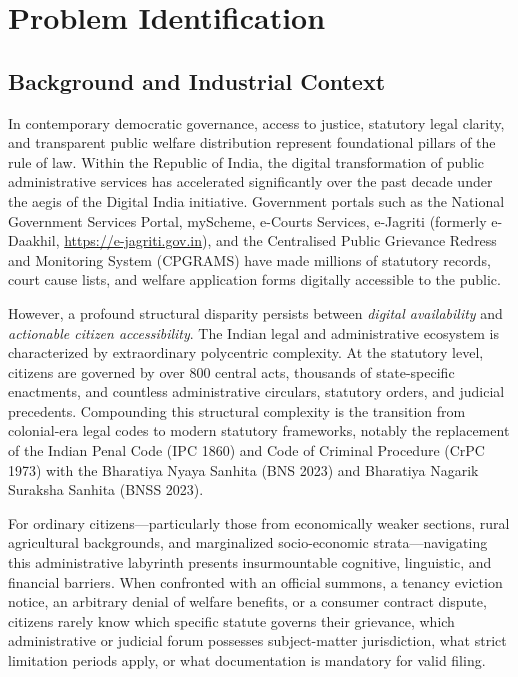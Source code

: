 \chapter{Problem Identification}
\label{ch:problem_identification}

\section{Background and Industrial Context}
\label{sec:background}
In contemporary democratic governance, access to justice, statutory legal clarity, and transparent public welfare distribution represent foundational pillars of the rule of law. Within the Republic of India, the digital transformation of public administrative services has accelerated significantly over the past decade under the aegis of the Digital India initiative. Government portals such as the National Government Services Portal, myScheme, e-Courts Services, e-Jagriti (formerly e-Daakhil, \url{https://e-jagriti.gov.in}), and the Centralised Public Grievance Redress and Monitoring System (CPGRAMS) have made millions of statutory records, court cause lists, and welfare application forms digitally accessible to the public.

However, a profound structural disparity persists between \textit{digital availability} and \textit{actionable citizen accessibility}. The Indian legal and administrative ecosystem is characterized by extraordinary polycentric complexity. At the statutory level, citizens are governed by over 800 central acts, thousands of state-specific enactments, and countless administrative circulars, statutory orders, and judicial precedents. Compounding this structural complexity is the transition from colonial-era legal codes to modern statutory frameworks, notably the replacement of the Indian Penal Code (IPC 1860) and Code of Criminal Procedure (CrPC 1973) with the Bharatiya Nyaya Sanhita (BNS 2023) and Bharatiya Nagarik Suraksha Sanhita (BNSS 2023).

For ordinary citizens---particularly those from economically weaker sections, rural agricultural backgrounds, and marginalized socio-economic strata---navigating this administrative labyrinth presents insurmountable cognitive, linguistic, and financial barriers. When confronted with an official summons, a tenancy eviction notice, an arbitrary denial of welfare benefits, or a consumer contract dispute, citizens rarely know which specific statute governs their grievance, which administrative or judicial forum possesses subject-matter jurisdiction, what strict limitation periods apply, or what documentation is mandatory for valid filing.


